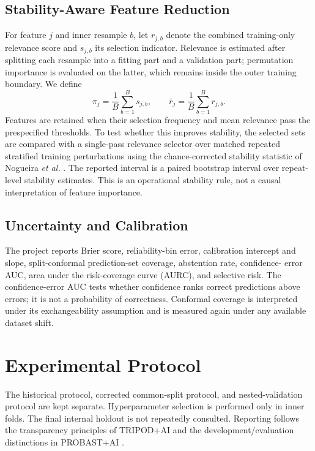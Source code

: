 \documentclass[journal]{IEEEtran}
\begin{document}
\subsection{Stability-Aware Feature Reduction}
For feature $j$ and inner resample $b$, let $r_{j,b}$ denote the combined
training-only relevance score and $s_{j,b}$ its selection indicator. Relevance
is estimated after splitting each resample into a fitting part and a validation
part; permutation importance is evaluated on the latter, which remains inside
the outer training boundary. We define
\begin{equation}
\pi_j = \frac{1}{B}\sum_{b=1}^{B}s_{j,b}, \qquad
\bar r_j = \frac{1}{B}\sum_{b=1}^{B}r_{j,b}.
\end{equation}
Features are retained when their selection frequency and mean relevance pass
the prespecified thresholds. To test whether this improves stability, the
selected sets are compared with a single-pass relevance selector over matched
repeated stratified training perturbations using the chance-corrected stability
statistic of Nogueira \emph{et al.} \cite{nogueira2018stability}. The reported
interval is a paired bootstrap interval over repeat-level stability estimates.
This is an operational stability rule, not a causal interpretation of feature
importance.

\subsection{Uncertainty and Calibration}
The project reports Brier score, reliability-bin error, calibration intercept
and slope, split-conformal prediction-set coverage, abstention rate, confidence-
error AUC, area under the risk-coverage curve (AURC), and selective risk. The
confidence-error AUC tests whether confidence ranks correct predictions above
errors; it is not a probability of correctness. Conformal coverage is
interpreted under its exchangeability assumption \cite{angelopoulos2023conformal}
and is measured again under any available dataset shift.

\section{Experimental Protocol}
The historical protocol, corrected common-split protocol, and nested-validation
protocol are kept separate. Hyperparameter selection is performed only in inner
folds. The final internal holdout is not repeatedly consulted. Reporting follows
the transparency principles of TRIPOD+AI \cite{collins2024tripodai} and the
development/evaluation distinctions in PROBAST+AI \cite{moons2025probastai}.
\end{document}
